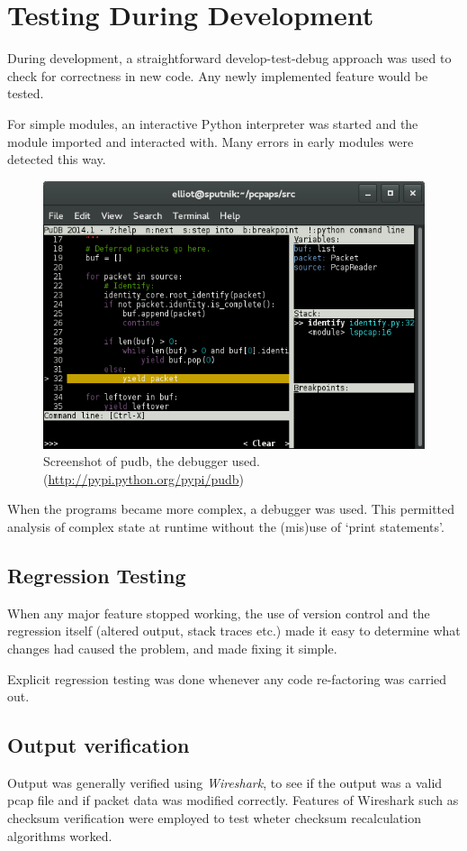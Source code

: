 \documentclass[10pt,a4paper,notitlepage]{report}
\begin{document}
\section{Testing During Development}
During development, a straightforward develop-test-debug approach was used to check for correctness in new code. Any newly implemented feature would be tested.

For simple modules, an interactive Python interpreter was started and the module imported and interacted with. Many errors in early modules were detected this way.

\begin{figure}[H]
\center
\includegraphics[scale=0.75]{pictures/pudb.png}
\caption{Screenshot of pudb, the debugger used. (\url{http://pypi.python.org/pypi/pudb})}
\end{figure}

When the programs became more complex, a debugger was used. This permitted analysis of complex state at runtime without the (mis)use of `print statements'.

\subsection{Regression Testing}
When any major feature stopped working, the use of version control and the regression itself (altered output, stack traces etc.) made it easy to determine what changes had caused the problem, and made fixing it simple.

Explicit regression testing was done whenever any code re-factoring was carried out.

\subsection{Output verification}
Output was generally verified using \emph{Wireshark}, to see if the output was a valid pcap file and if packet data was modified correctly. Features of Wireshark such as checksum verification were employed to test wheter checksum recalculation algorithms worked.
\end{document}
